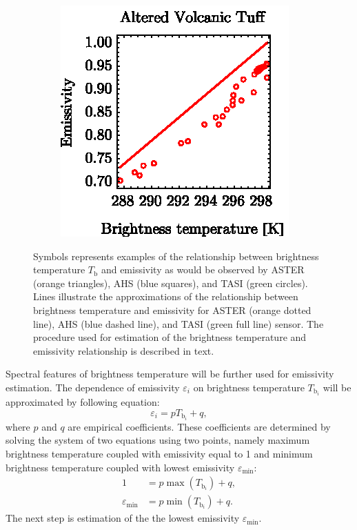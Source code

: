\begin{figure}[thb]
\begin{subfigure}[t]{.3\linewidth}
		\centering
		\includegraphics[scale=1]{pics/Chapter_03/AlteredVolcanicTuff_Emiss2BrightTemp.eps}
		\vspace{-0.4cm}
		\caption{}
	\end{subfigure}
	\vspace{1.5 em}
	\caption{Symbols represents examples of the relationship between brightness temperature $T_\mathrm{b}$ and emissivity as would be observed by ASTER (orange triangles), AHS (blue squares), and TASI (green circles). Lines illustrate the approximations of the relationship between brightness temperature and emissivity for ASTER (orange dotted line), AHS (blue dashed line), and TASI (green full line) sensor. The procedure used for estimation  {of} the brightness temperature and emissivity relationship is described in text.}
\label{fig:relationship}
\end{figure}


Spectral features of brightness temperature will be further used for emissivity estimation. The dependence of emissivity $ {\varepsilon_i}$ on brightness temperature $ {T_{\mathrm{b}_i}}$ will be approximated by following equation:
\begin{equation} \varepsilon_{ {i}} =  {p} T_{\mathrm{b}_{ {i}}} +  {q}, \label{eq:relationship}\end{equation}
where $ {p}$ and $ {q}$ are empirical coefficients. These coefficients are determined by solving the system of two equations using two points, namely maximum brightness temperature coupled with emissivity equal to 1 and minimum brightness temperature coupled with lowest emissivity $\varepsilon_\mathrm{min}$:
\begin{equation}
\begin{aligned}
	1 &=  {p} \max (T_{\mathrm{b}_{ {i}}}) +  {q}, \\
	\varepsilon_\mathrm{min} &=  {p} \min (T_{\mathrm{b}_{ {i}}}) +  {q}.
\end{aligned}
\label{eq:sytemofeq}
\end{equation}
The next step is estimation of the the lowest emissivity $\varepsilon_\mathrm{min}$.

